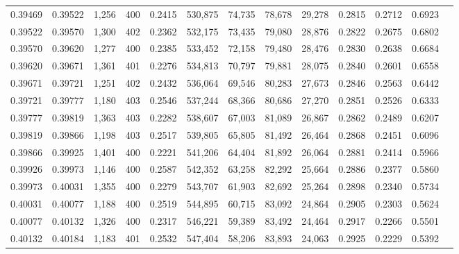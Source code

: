 \begin{tabular}{rrrrrrrrrrrrr}
0.39469 & 0.39522 &  1,256 & 400 &                                     0.2415 & 530,875 &  74,735 &  78,678 &  29,278 & 0.2815 & 0.2712 & 0.6923 \\
0.39522 & 0.39570 &  1,300 & 402 &                                     0.2362 & 532,175 &  73,435 &  79,080 &  28,876 & 0.2822 & 0.2675 & 0.6802 \\
0.39570 & 0.39620 &  1,277 & 400 &                                     0.2385 & 533,452 &  72,158 &  79,480 &  28,476 & 0.2830 & 0.2638 & 0.6684 \\
0.39620 & 0.39671 &  1,361 & 401 &                                     0.2276 & 534,813 &  70,797 &  79,881 &  28,075 & 0.2840 & 0.2601 & 0.6558 \\
0.39671 & 0.39721 &  1,251 & 402 &                                     0.2432 & 536,064 &  69,546 &  80,283 &  27,673 & 0.2846 & 0.2563 & 0.6442 \\
0.39721 & 0.39777 &  1,180 & 403 &                                     0.2546 & 537,244 &  68,366 &  80,686 &  27,270 & 0.2851 & 0.2526 & 0.6333 \\
0.39777 & 0.39819 &  1,363 & 403 &                                     0.2282 & 538,607 &  67,003 &  81,089 &  26,867 & 0.2862 & 0.2489 & 0.6207 \\
0.39819 & 0.39866 &  1,198 & 403 &                                     0.2517 & 539,805 &  65,805 &  81,492 &  26,464 & 0.2868 & 0.2451 & 0.6096 \\
0.39866 & 0.39925 &  1,401 & 400 &                                     0.2221 & 541,206 &  64,404 &  81,892 &  26,064 & 0.2881 & 0.2414 & 0.5966 \\
0.39926 & 0.39973 &  1,146 & 400 &                                     0.2587 & 542,352 &  63,258 &  82,292 &  25,664 & 0.2886 & 0.2377 & 0.5860 \\
0.39973 & 0.40031 &  1,355 & 400 &                                     0.2279 & 543,707 &  61,903 &  82,692 &  25,264 & 0.2898 & 0.2340 & 0.5734 \\
0.40031 & 0.40077 &  1,188 & 400 &                                     0.2519 & 544,895 &  60,715 &  83,092 &  24,864 & 0.2905 & 0.2303 & 0.5624 \\
0.40077 & 0.40132 &  1,326 & 400 &                                     0.2317 & 546,221 &  59,389 &  83,492 &  24,464 & 0.2917 & 0.2266 & 0.5501 \\
0.40132 & 0.40184 &  1,183 & 401 &                                     0.2532 & 547,404 &  58,206 &  83,893 &  24,063 & 0.2925 & 0.2229 & 0.5392 \\

\end{tabular}
